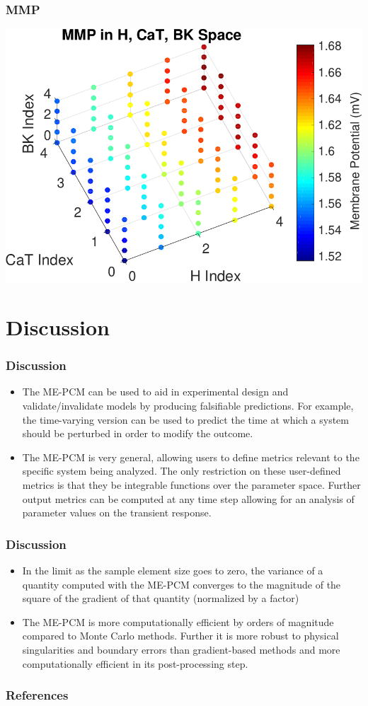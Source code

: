 \documentclass{beamer}
\theoremstyle{plain}
\theoremstyle{definition}
\begin{document}
\begin{frame}\frametitle{MMP}
  \begin{center}
    \includegraphics[scale=.7]{MMPScatter.pdf}%
  \end{center}
\end{frame}

\section{Discussion}

\begin{frame}\frametitle{Discussion}
 \begin{itemize}
  \item The ME-PCM can be used to aid in experimental design and validate/invalidate models by producing falsifiable predictions. For example, the time-varying version can be used to predict the time at which a system should be perturbed in order to modify the outcome.
  \item The ME-PCM is very general, allowing users to define metrics relevant to the specific system being analyzed. The only restriction on these user-defined metrics is that they be integrable functions over the parameter space. Further output metrics can be computed at any time step allowing for an analysis of parameter values on the transient response.
 \end{itemize}
\end{frame}

\begin{frame}\frametitle{Discussion}
 \begin{itemize}
  \item In the limit as the sample element size goes to zero, the variance of a quantity computed with the ME-PCM converges to the magnitude of the square of the gradient of that quantity (normalized by a factor)
  \item The ME-PCM is more computationally efficient by orders of magnitude compared to Monte Carlo methods. Further it is more robust to physical singularities and boundary errors than gradient-based methods and more computationally efficient in its post-processing step.
 \end{itemize}
\end{frame}

\begin{frame}\frametitle{References}
  \printbibliography
\end{frame}
\end{document}
